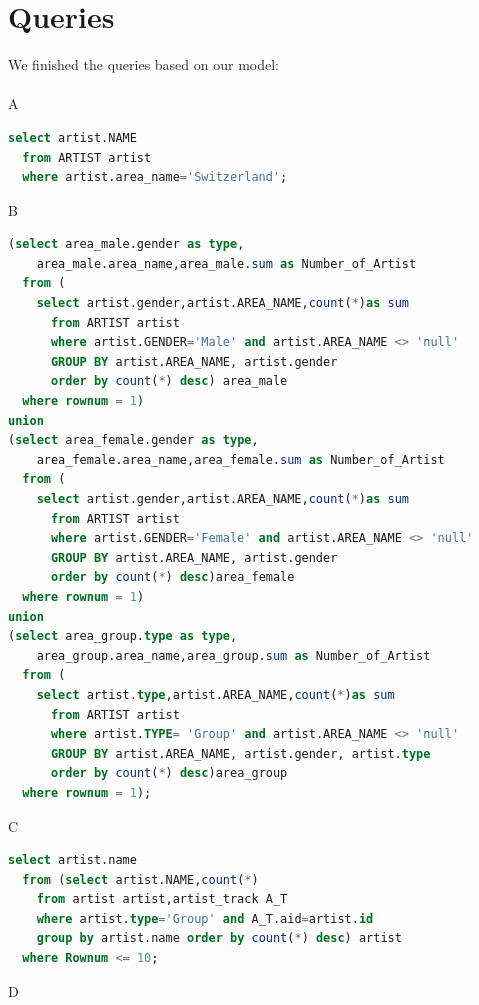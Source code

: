 \documentclass[11pt]{article} %
\begin{document}
\normalsize{
\section{Queries}
We finished the queries based on our model: \\ \\
A
\begin{lstlisting}[language=SQL, keywordstyle=\color{blue!70},
commentstyle=\color{red!50!green!50!blue!50},
rulesepcolor=\color{red!20!green!20!blue!20},
frame=shadowbox]
select artist.NAME
  from ARTIST artist
  where artist.area_name='Switzerland';
\end{lstlisting}
B
\begin{lstlisting}[language=SQL, keywordstyle=\color{blue!70},
commentstyle=\color{red!50!green!50!blue!50},
rulesepcolor=\color{red!20!green!20!blue!20},
frame=shadowbox]
(select area_male.gender as type,
    area_male.area_name,area_male.sum as Number_of_Artist 
  from (
    select artist.gender,artist.AREA_NAME,count(*)as sum
      from ARTIST artist
      where artist.GENDER='Male' and artist.AREA_NAME <> 'null'
      GROUP BY artist.AREA_NAME, artist.gender
      order by count(*) desc) area_male
  where rownum = 1)
union
(select area_female.gender as type,
    area_female.area_name,area_female.sum as Number_of_Artist 
  from (
    select artist.gender,artist.AREA_NAME,count(*)as sum
      from ARTIST artist
      where artist.GENDER='Female' and artist.AREA_NAME <> 'null'
      GROUP BY artist.AREA_NAME, artist.gender
      order by count(*) desc)area_female
  where rownum = 1)
union
(select area_group.type as type,
    area_group.area_name,area_group.sum as Number_of_Artist 
  from (
    select artist.type,artist.AREA_NAME,count(*)as sum
      from ARTIST artist
      where artist.TYPE= 'Group' and artist.AREA_NAME <> 'null'
      GROUP BY artist.AREA_NAME, artist.gender, artist.type
      order by count(*) desc)area_group
  where rownum = 1);  
\end{lstlisting}
C
\begin{lstlisting}[language=SQL, keywordstyle=\color{blue!70},
commentstyle=\color{red!50!green!50!blue!50},
rulesepcolor=\color{red!20!green!20!blue!20},
frame=shadowbox]
select artist.name
  from (select artist.NAME,count(*)
    from artist artist,artist_track A_T
    where artist.type='Group' and A_T.aid=artist.id
    group by artist.name order by count(*) desc) artist
  where Rownum <= 10;
\end{lstlisting}
D
\begin{lstlisting}[language=SQL, keywordstyle=\color{blue!70},
commentstyle=\color{red!50!green!50!blue!50},
rulesepcolor=\color{red!20!green!20!blue!20},
frame=shadowbox]

\end{lstlisting}}
\end{document}
